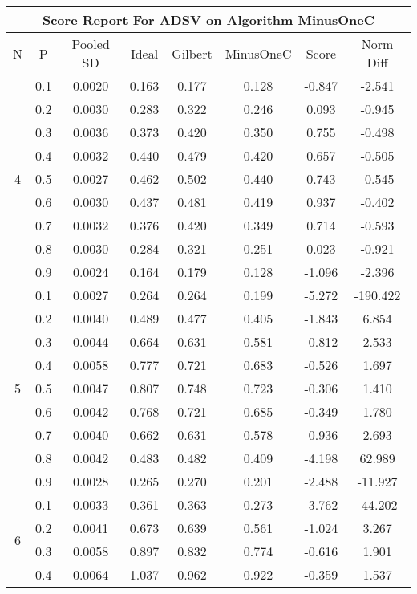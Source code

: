\documentclass[11pt,a4paper]{report}
\begin{document}
\begin{longtable}{ | c | c || c | c | c | c | c | c | }
\hline
\multicolumn{8}{|c|}{ Score Report For ADSV on Algorithm MinusOneC} \\
\hline
N & P & Pooled SD &  Ideal &  Gilbert & MinusOneC  & Score & Norm Diff \\
 \hline
 \hline
 \endhead
\multirow{9}{*}{4} & 0.1 & 0.0020 & 0.163 & 0.177 & 0.128 & -0.847 & -2.541 \\
 & 0.2 & 0.0030 & 0.283 & 0.322 & 0.246 & 0.093 & -0.945 \\
 & 0.3 & 0.0036 & 0.373 & 0.420 & 0.350 & 0.755 & -0.498 \\
 & 0.4 & 0.0032 & 0.440 & 0.479 & 0.420 & 0.657 & -0.505 \\
 & 0.5 & 0.0027 & 0.462 & 0.502 & 0.440 & 0.743 & -0.545 \\
 & 0.6 & 0.0030 & 0.437 & 0.481 & 0.419 & 0.937 & -0.402 \\
 & 0.7 & 0.0032 & 0.376 & 0.420 & 0.349 & 0.714 & -0.593 \\
 & 0.8 & 0.0030 & 0.284 & 0.321 & 0.251 & 0.023 & -0.921 \\
 & 0.9 & 0.0024 & 0.164 & 0.179 & 0.128 & -1.096 & -2.396 \\
 \hline
\multirow{9}{*}{5} & 0.1 & 0.0027 & 0.264 & 0.264 & 0.199 & -5.272 & -190.422 \\
 & 0.2 & 0.0040 & 0.489 & 0.477 & 0.405 & -1.843 & 6.854 \\
 & 0.3 & 0.0044 & 0.664 & 0.631 & 0.581 & -0.812 & 2.533 \\
 & 0.4 & 0.0058 & 0.777 & 0.721 & 0.683 & -0.526 & 1.697 \\
 & 0.5 & 0.0047 & 0.807 & 0.748 & 0.723 & -0.306 & 1.410 \\
 & 0.6 & 0.0042 & 0.768 & 0.721 & 0.685 & -0.349 & 1.780 \\
 & 0.7 & 0.0040 & 0.662 & 0.631 & 0.578 & -0.936 & 2.693 \\
 & 0.8 & 0.0042 & 0.483 & 0.482 & 0.409 & -4.198 & 62.989 \\
 & 0.9 & 0.0028 & 0.265 & 0.270 & 0.201 & -2.488 & -11.927 \\
 \hline
\multirow{9}{*}{6} & 0.1 & 0.0033 & 0.361 & 0.363 & 0.273 & -3.762 & -44.202 \\
 & 0.2 & 0.0041 & 0.673 & 0.639 & 0.561 & -1.024 & 3.267 \\
 & 0.3 & 0.0058 & 0.897 & 0.832 & 0.774 & -0.616 & 1.901 \\
 & 0.4 & 0.0064 & 1.037 & 0.962 & 0.922 & -0.359 & 1.537 \\

\end{longtable}
\end{document}
